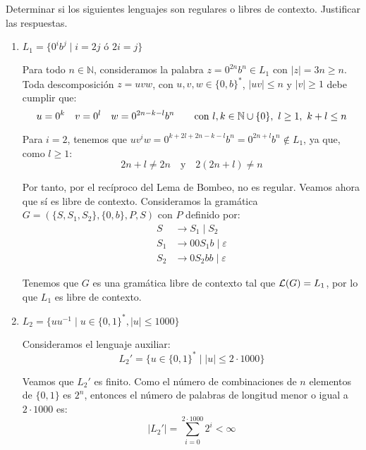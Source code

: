 \begin{ejercicio}\label{ej:1.3.1}
    Determinar si los siguientes lenguajes son regulares o libres de contexto. Justificar las respuestas.
    \begin{enumerate}
        \item $L_1=\{0^i b^j \mid i = 2j \text{\ ó\ } 2i=j\}$
        
        Para todo $n\in \mathbb{N}$, consideramos la palabra $z=0^{2n}b^n\in L_1$ con $|z|=3n\geq n$. Toda descomposición $z=uvw$, con $u,v,w\in \{0,b\}^\ast$, $|uv|\leq n$ y $|v|\geq 1$ debe cumplir que:
        \begin{equation*}
            u=0^k \quad v=0^l \quad w=0^{2n-k-l}b^n \qquad \text{con } l,k\in \mathbb{N}\cup \{0\},~l\geq 1,~k+l\leq n
        \end{equation*}

        Para $i=2$, tenemos que $uv^iw=0^{k+2l+2n-k-l}b^n=0^{2n+l}b^n\notin L_1$, ya que, como $l\geq 1$:
        \begin{equation*}
            2n+l\neq 2n \quad \text{y} \quad 2(2n+l)\neq n
        \end{equation*}

        Por tanto, por el recíproco del Lema de Bombeo, no es regular. Veamos ahora que sí es libre de contexto. Consideramos la gramática $G=(\{S,S_1,S_2\},\{0,b\},P,S)$ con $P$ definido por:
        \begin{align*}
            S &\rightarrow S_1 \mid S_2 \\
            S_1 &\rightarrow 00S_1b \mid \varepsilon \\
            S_2 &\rightarrow 0S_2bb \mid \varepsilon
        \end{align*}

        Tenemos que $G$ es una gramática libre de contexto tal que $\mathcal{L}(G)=L_1$, por lo que $L_1$ es libre de contexto.

        \item $L_2=\{uu^{-1} \mid u \in {\{0,1\}}^\ast, |u|\leq 1000\}$
        
        Consideramos el lenguaje auxiliar:
        \begin{equation*}
            L_2' = \{u\in \{0,1\}^\ast \mid |u|\leq 2\cdot 1000\}
        \end{equation*}

        Veamos que $L_2'$ es finito. Como el número de combinaciones de $n$ elementos de $\{0,1\}$ es $2^n$, entonces el número de palabras de longitud menor o igual a $2\cdot 1000$ es:
        \begin{equation*}
            |L_2'| = \sum_{i=0}^{2\cdot 1000} 2^i <\infty
        \end{equation*}


\end{enumerate}
\end{ejercicio}
